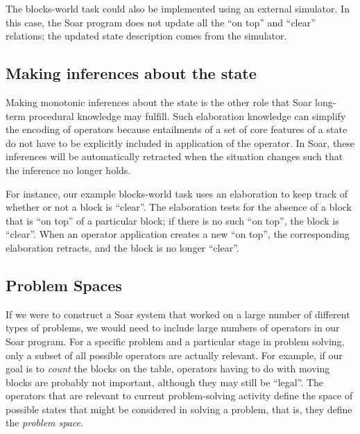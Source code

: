 The blocks-world task could also be implemented using an external simulator. In this case,
the Soar program does not update all the ``on top'' and ``clear'' relations;
the updated state description comes from the simulator.

\subsection{Making inferences about the state}

Making monotonic inferences about the state is the other role that Soar
long-term procedural knowledge may fulfill. Such elaboration knowledge can simplify
the encoding of operators because entailments of a set of core features
of a state do not have to be explicitly included in application of the
operator.  In Soar, these inferences will be automatically retracted
when the situation changes such that the inference no longer holds.

For instance, our example blocks-world task uses an elaboration to keep track
of whether or not a block is ``clear''. The elaboration tests for the absence
of a block that is ``on top'' of a particular block; if there is no such ``on top'',
the block is ``clear''. When an operator application creates a new ``on top'', the
corresponding elaboration retracts, and the block is no longer ``clear''.


\subsection{Problem Spaces}
\label{ARCH-functions-ps}

If we were to construct a Soar system that worked on a large number of
different types of problems, we would need to include large numbers of
operators in our Soar program. For a specific problem and a
particular stage in problem solving, only a subset of all possible operators
are actually relevant. For example, if our goal is to \textit{count} the
blocks on the table, operators having to do with moving blocks are probably
not important, although they may still be ``legal''. The operators that are
relevant to current problem-solving activity define the space of possible
states that might be considered in solving a problem, that is, they define the
\emph{problem space}.

